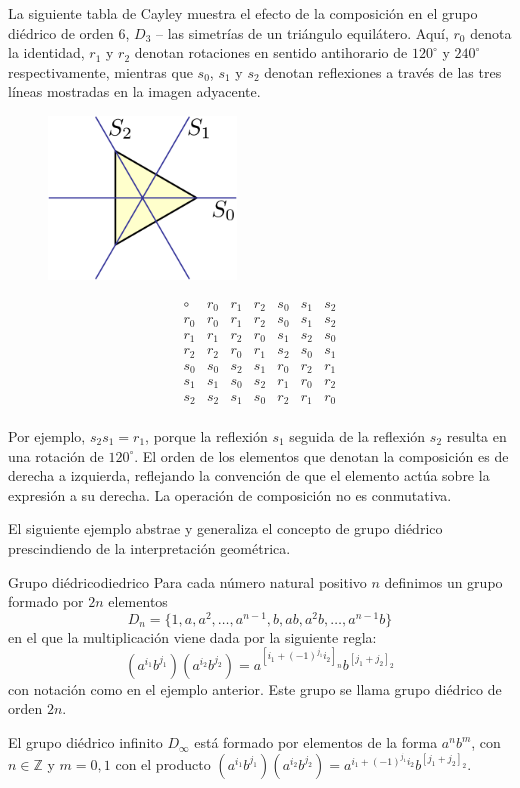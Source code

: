 La siguiente tabla de Cayley muestra el efecto de la composición en el grupo diédrico de orden 6, \(D_3\) -- las simetrías de un triángulo equilátero. Aquí, \(r_0\) denota la identidad, \(r_1\) y \(r_2\) denotan rotaciones en sentido antihorario de \(120^\circ\) y \(240^\circ\) respectivamente, mientras que \(s_0\), \(s_1\) y \(s_2\) denotan reflexiones a través de las tres líneas mostradas en la imagen adyacente.

\begin{figure}[h]
    \centering
    \includegraphics[width=5cm]{img/diedrico.png}
\end{figure}

\[
\begin{array}{c|cccccc}
\circ & r_0 & r_1 & r_2 & s_0 & s_1 & s_2 \\
\hline
r_0 & r_0 & r_1 & r_2 & s_0 & s_1 & s_2 \\
r_1 & r_1 & r_2 & r_0 & s_1 & s_2 & s_0 \\
r_2 & r_2 & r_0 & r_1 & s_2 & s_0 & s_1 \\
s_0 & s_0 & s_2 & s_1 & r_0 & r_2 & r_1 \\
s_1 & s_1 & s_0 & s_2 & r_1 & r_0 & r_2 \\
s_2 & s_2 & s_1 & s_0 & r_2 & r_1 & r_0 \\
\end{array}
\]

Por ejemplo, \(s_2 s_1 = r_1\), porque la reflexión \(s_1\) seguida de la reflexión \(s_2\) resulta en una rotación de \(120^\circ\). El orden de los elementos que denotan la composición es de derecha a izquierda, reflejando la convención de que el elemento actúa sobre la expresión a su derecha. La operación de composición no es conmutativa.

El siguiente ejemplo abstrae y generaliza el concepto de grupo diédrico prescindiendo de la interpretación geométrica.

\begin{example}{Grupo diédrico}{diedrico}
    Para cada número natural positivo \(n\) definimos un grupo formado por \(2n\) elementos
    \[
    D_n = \{1, a, a^2, \ldots, a^{n-1}, b, ab, a^2b, \ldots, a^{n-1}b\}
    \]
    en el que la multiplicación viene dada por la siguiente regla:
    \[
    (a^{i_1} b^{j_1})(a^{i_2} b^{j_2}) = a^{[i_1 + (-1)^{j_1} i_2]_n} b^{[j_1 + j_2]_2}
    \]
    con notación como en el ejemplo anterior. Este grupo se llama {grupo diédrico de orden \(2n\)}.

    El grupo diédrico infinito \(D_\infty\) está formado por elementos de la forma \(a^n b^m\), con \(n \in \mathbb{Z}\) y \(m = 0, 1\) con el producto \((a^{i_1} b^{j_1})(a^{i_2} b^{j_2}) = a^{i_1 + (-1)^{j_1} i_2} b^{[j_1 + j_2]_2}\).
\end{example}


